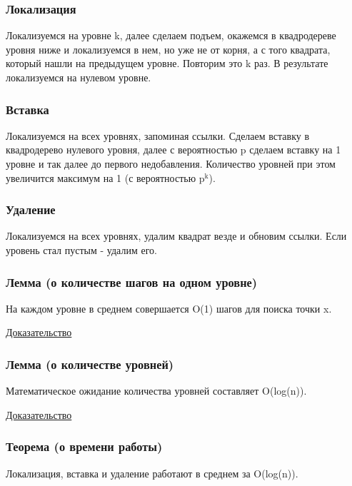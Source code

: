 \documentclass[11pt]{article}
\begin{document}
\subsubsection{Локализация}
\label{sec:orgheadline9}
Локализуемся на уровне k, далее сделаем подъем, окажемся в
квадродереве уровня ниже и локализуемся в нем, но уже не от корня,
а с того квадрата, который нашли на предыдущем уровне. Повторим
это k раз. В результате локализуемся на нулевом уровне.
\subsubsection{Вставка}
\label{sec:orgheadline10}
Локализуемся на всех уровнях, запоминая ссылки. Сделаем вставку в
квадродерево нулевого уровня, далее с вероятностью p сделаем
вставку на 1 уровне и так далее до первого недобавления.
Количество уровней при этом увеличится максимум на 1 (с
вероятностью p\(^{\text{k}}\)).
\subsubsection{Удаление}
\label{sec:orgheadline11}
Локализуемся на всех уровнях, удалим квадрат везде и обновим
ссылки. Если уровень стал пустым - удалим его.
\subsubsection{Лемма (о количестве шагов на одном уровне)}
\label{sec:orgheadline12}
На каждом уровне в среднем совершается O(1) шагов для поиска точки
x.

\href{http://neerc.ifmo.ru/wiki/index.php?title=Skip_quadtree:_определение,_время_работы#.D0.92.D1.80.D0.B5.D0.BC.D1.8F_.D1.80.D0.B0.D0.B1.D0.BE.D1.82.D1.8B_.D0.B8_.D0.BF.D0.B0.D0.BC.D1.8F.D1.82.D1.8C}{Доказательство}
\subsubsection{Лемма (о количестве уровней)}
\label{sec:orgheadline13}
Математическое ожидание количества уровней составляет O(log(n)).

\href{http://neerc.ifmo.ru/wiki/index.php?title=Skip_quadtree:_определение,_время_работы#.D0.92.D1.80.D0.B5.D0.BC.D1.8F_.D1.80.D0.B0.D0.B1.D0.BE.D1.82.D1.8B_.D0.B8_.D0.BF.D0.B0.D0.BC.D1.8F.D1.82.D1.8C}{Доказательство}
\subsubsection{Теорема (о времени работы)}
\label{sec:orgheadline14}
Локализация, вставка и удаление работают в среднем за O(log(n)).
\end{document}
